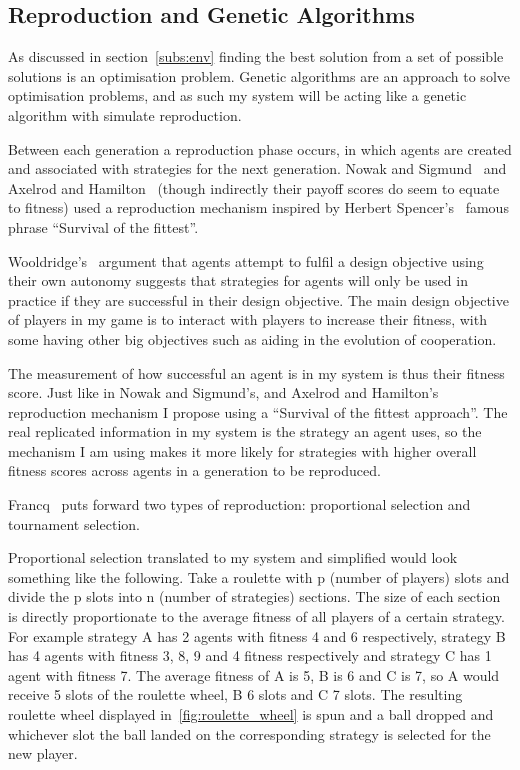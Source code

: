 \documentclass[]{final_report}
\begin{document}
\subsection{Reproduction and Genetic Algorithms}
\label{subs:backgroundreproduction}
As discussed in section~\ref{subs:env} finding the best solution from a set of possible solutions is an optimisation problem. Genetic algorithms are an approach to solve optimisation problems, and as such my system will be acting like a genetic algorithm with simulate reproduction.\par
Between each generation a reproduction phase occurs, in which agents are created and associated with strategies for the next generation. Nowak and Sigmund~\cite{evol_indirect_image} and Axelrod and Hamilton~\cite{evolution_of_cooperation} (though indirectly their payoff scores do seem to equate to fitness) used a reproduction mechanism inspired by Herbert Spencer's~\cite{spencer1864principles} famous phrase ``Survival of the fittest''.\par
Wooldridge's~\cite{wooldridge2009introduction} argument that agents attempt to fulfil a design objective using their own autonomy suggests that strategies for agents will only be used in practice if they are successful in their design objective. The main design objective of players in my game is to interact with players to increase their fitness, with some having other big objectives such as aiding in the evolution of cooperation.\par
The measurement of how successful an agent is in my system is thus their fitness score. Just like in Nowak and Sigmund's, and Axelrod and Hamilton's reproduction mechanism I propose using a ``Survival of the fittest approach''. The real replicated information in my system is the strategy an agent uses, so the mechanism I am using makes it more likely for strategies with higher overall fitness scores across agents in a generation to be reproduced.\par
Francq~\cite{genetic_algorithms} puts forward two types of reproduction: proportional selection and tournament selection.\par
Proportional selection translated to my system and simplified would look something like the following. Take a roulette with p (number of players) slots and divide the p slots into n (number of strategies) sections. The size of each section is directly proportionate to the average fitness of all players of a certain strategy. For example strategy A has 2 agents with fitness 4 and 6 respectively, strategy B has 4 agents with fitness 3, 8, 9 and 4 fitness respectively and strategy C has 1 agent with fitness 7. The average fitness of A is 5, B is 6 and C is 7, so A would receive 5 slots of the roulette wheel, B 6 slots and C 7 slots. The resulting roulette wheel displayed in~\ref{fig:roulette_wheel} is spun and a ball dropped and whichever slot the ball landed on the corresponding strategy is selected for the new player.\par
\end{document}
